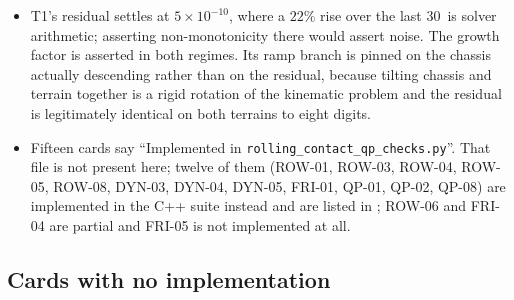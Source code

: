 \documentclass[10pt]{article}
\newcommand{\harness}{\texttt{rolling\_contact\_qp\_checks.py}\xspace}
\begin{document}
\begin{itemize}
    by a straight run down the fall line. A differential chassis pointed down a
    $15$\unitDegree\ slope curves away from the commanded heading, because the
    instant it yaws at all gravity gains a body-lateral component while the hard
    lateral row still forbids lateral velocity at the carrier. Only the
    fall-line share of the path becomes height, and the bound uses the
    odometry's own estimate of it.
  \item {}
    T1's residual settles at $5\times10^{-10}$\unitVelTS, where a $22\%$ rise
    over the last $30$\unitTime\ is solver arithmetic; asserting
    non-monotonicity there would assert noise. The growth factor is asserted in
    both regimes. Its ramp branch is pinned on the chassis actually descending
    rather than on the residual, because tilting chassis and terrain together is
    a rigid rotation of the kinematic problem and the residual is legitimately
    identical on both terrains to eight digits.
  \item {}
    Fifteen cards say ``Implemented in \harness''. That file is not present
    here; twelve of them (ROW-01, ROW-03, ROW-04, ROW-05, ROW-08, DYN-03,
    DYN-04, DYN-05, FRI-01, QP-01, QP-02, QP-08) are implemented in the C++
    suite instead and are listed in
    ; ROW-06 and FRI-04 are partial and
    FRI-05 is not implemented at all.
\end{itemize}

\subsection{Cards with no implementation}
\label{sec:test-gaps-unimplemented}
\end{document}
